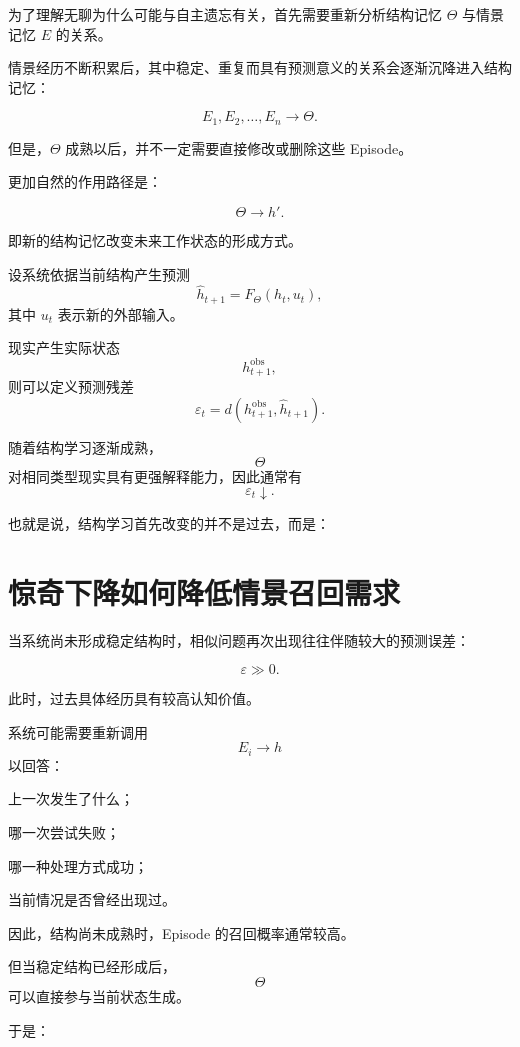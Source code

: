 为了理解无聊为什么可能与自主遗忘有关，首先需要重新分析结构记忆 $\Theta$ 与情景记忆 $E$ 的关系。

情景经历不断积累后，其中稳定、重复而具有预测意义的关系会逐渐沉降进入结构记忆：

\[
E_1,E_2,\ldots,E_n
\longrightarrow
\Theta.
\]

但是，$\Theta$ 成熟以后，并不一定需要直接修改或删除这些 Episode。

更加自然的作用路径是：

\[
\boxed{
\Theta
\rightarrow
h'.
}
\]

即新的结构记忆改变未来工作状态的形成方式。

设系统依据当前结构产生预测
\[
\hat h_{t+1}
=
F_\Theta(h_t,u_t),
\]
其中 $u_t$ 表示新的外部输入。

现实产生实际状态
\[
h_{t+1}^{\mathrm{obs}},
\]
则可以定义预测残差
\[
\varepsilon_t
=
d
\left(
h_{t+1}^{\mathrm{obs}},
\hat h_{t+1}
\right).
\]

随着结构学习逐渐成熟，
\[
\Theta
\]
对相同类型现实具有更强解释能力，因此通常有
\[
\boxed{
\varepsilon_t\downarrow.
}
\]

也就是说，结构学习首先改变的并不是过去，而是：

\begin{statementbox}
\centering
{}
\end{statementbox}

\section{惊奇下降如何降低情景召回需求}

当系统尚未形成稳定结构时，相似问题再次出现往往伴随较大的预测误差：

\[
\varepsilon\gg 0.
\]

此时，过去具体经历具有较高认知价值。

系统可能需要重新调用
\[
E_i\rightarrow h
\]
以回答：

上一次发生了什么；

哪一次尝试失败；

哪一种处理方式成功；

当前情况是否曾经出现过。

因此，结构尚未成熟时，Episode 的召回概率通常较高。

但当稳定结构已经形成后，
\[
\Theta
\]
可以直接参与当前状态生成。

于是：

